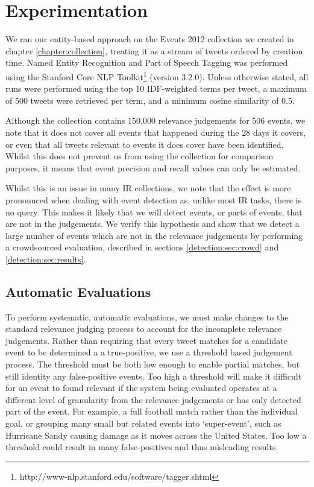 
\section{Experimentation}
\label{detection:sec:experimentation}
We ran our entity-based approach on the Events 2012 collection we created in chapter \ref{chapter:collection}, treating it as a stream of tweets ordered by creation time.
Named Entity Recognition and Part of Speech Tagging was performed using the Stanford Core NLP Toolkit\footnote{http://www-nlp.stanford.edu/software/tagger.shtml} (version 3.2.0).
Unless otherwise stated, all runs were performed using the top 10 IDF-weighted terms per tweet, a maximum of 500 tweets were retrieved per term, and a minimum cosine similarity of 0.5.

Although the collection contains 150,000 relevance judgements for 506 events, we note that it does not cover all events that happened during the 28 days it covers, or even that all tweets relevant to events it does cover have been identified.
Whilst this does not prevent us from using the collection for comparison purposes, it means that event precision and recall values can only be estimated.

Whilst this is an issue in many IR collections, we note that the effect is more pronounced when dealing with event detection as, unlike most IR tasks, there is no query.
This makes it likely that we will detect events, or parts of events, that are not in the judgements.
We verify this hypothesis and show that we detect a large number of events which are not in the relevance judgements by performing a crowdsourced evaluation, described in sections \ref{detection:sec:crowd} and \ref{detection:sec:results}.

\subsection{Automatic Evaluations}
To perform systematic, automatic evaluations, we must make changes to the standard relevance judging process to account for the incomplete relevance judgements.
Rather than requiring that every tweet matches for a candidate event to be determined a a true-positive, we use a threshold based judgement process.
The threshold must be both low enough to enable partial matches, but still identity any false-positive events.
Too high a threshold will make it difficult for an event to found relevant if the system being evaluated operates at a different level of granularity from the relevance judgements or has only detected part of the event.
For example, a full football match rather than the individual goal, or grouping many small but related events into `super-event', such as Hurricane Sandy causing damage as it moves across the United States.
Too low a threshold could result in many false-positives and thus misleading results.

